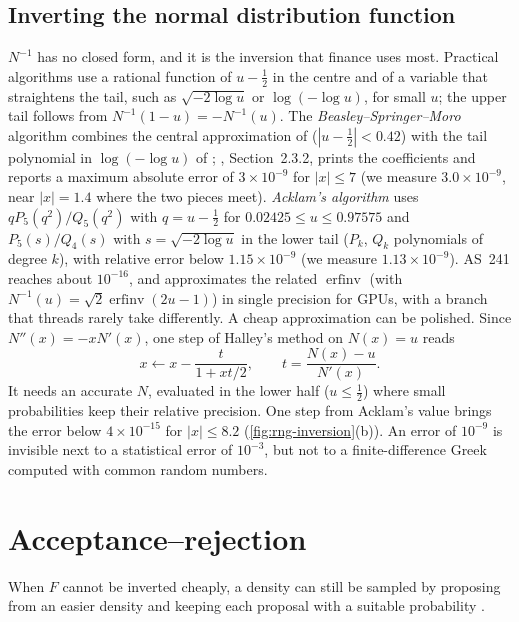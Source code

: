 \subsection{Inverting the normal distribution function}

$N^{-1}$ has no closed form, and it is the inversion that finance uses most. Practical
algorithms use a rational function of $u-\frac12$ in the centre and of a variable that
straightens the tail, such as $\sqrt{-2\log u}$ or $\log(-\log u)$, for small $u$; the upper
tail follows from $N^{-1}(1-u)=-N^{-1}(u)$. The \emph{Beasley--Springer--Moro} algorithm
combines the central approximation of \textcite{beasley-springer} ($|u-\frac12|<0.42$) with
the tail polynomial in $\log(-\log u)$ of \textcite{moro-full-monte};
\textcite{glasserman-mc}, Section~2.3.2, prints the coefficients and reports a maximum
absolute error of $3\times10^{-9}$ for $|x|\le7$ (we measure $3.0\times10^{-9}$, near $|x|=1.4$
where the two pieces meet).
\emph{Acklam's algorithm} \citep{acklam} uses $qP_5(q^2)/Q_5(q^2)$ with $q=u-\frac12$ for
$0.02425\le u\le0.97575$ and $P_5(s)/Q_4(s)$ with $s=\sqrt{-2\log u}$ in the lower tail
($P_k$, $Q_k$ polynomials of degree $k$), with relative error below $1.15\times10^{-9}$ (we
measure $1.13\times10^{-9}$). AS~241 \citep{wichura} reaches about $10^{-16}$, and
\textcite{giles-erfinv} approximates the related $\operatorname{erfinv}$ (with
$N^{-1}(u)=\sqrt2\operatorname{erfinv}(2u-1)$) in single precision for GPUs, with a branch
that threads rarely take differently. A cheap
approximation can be polished. Since $N''(x)=-xN'(x)$, one step of Halley's method
on $N(x)=u$ reads
\begin{equation}\label{eq:rng-halley}
  x\leftarrow x-\frac{t}{1+xt/2},\qquad t=\frac{N(x)-u}{N'(x)} .
\end{equation}
It needs an accurate $N$, evaluated in the lower half ($u\le\frac12$) where small
probabilities keep their relative precision. One step from Acklam's value brings the error
below $4\times10^{-15}$ for $|x|\le8.2$ (\cref{fig:rng-inversion}(b)). An error of $10^{-9}$
is invisible next to a statistical error of $10^{-3}$, but not to a finite-difference Greek
computed with common random numbers.

\section{Acceptance--rejection}\label{sec:rng-rejection}

When $F$ cannot be inverted cheaply, a density can still be sampled by proposing from an
easier density and keeping each proposal with a suitable probability \citep{von-neumann}.


